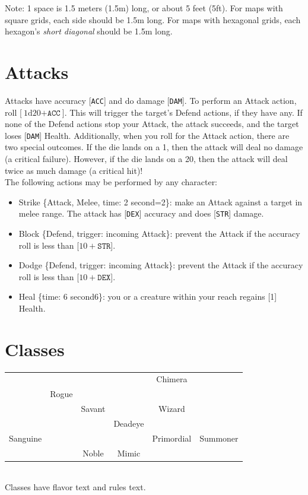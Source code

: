 \documentclass[12pt]{article}
\newcommand{\STR}{\texttt{STR}}
\newcommand{\DEX}{\texttt{DEX}}
\newcommand{\ACC}{\texttt{ACC}}
\newcommand{\DAM}{\texttt{DAM}}
\newcommand{\TIME}[1]{\{time: #1 second\if1#1{}\else{s}\fi\}}
\newcommand{\MELEE}[1]{\{Attack, Melee, time: #1 second\if1=#1{}\else{s}\fi\}}
\newcommand{\DEFEND}{\{Defend, trigger: incoming Attack\}}
\newcommand{\dice}[2]{\text{#1d#2}}
\begin{document}
Note: 1 space is 1.5 meters (1.5m) long, or about 5 feet (5ft). For maps with square grids, each side should be 1.5m long. For maps with hexagonal grids, each hexagon’s \textit{short diagonal} should be 1.5m long.

\pagebreak
\section{Attacks}

Attacks have accuracy [\ACC] and do damage [\DAM]. To perform an Attack action, roll [$\dice{1}{20} + \ACC$]. This will trigger the target’s Defend actions, if they have any. If none of the Defend actions stop your Attack, the attack succeeds, and the target loses [\DAM] Health. Additionally, when you roll for the Attack action, there are two special outcomes. If the die lands on a 1, then the attack will deal no damage (a critical failure). However, if the die lands on a 20, then the attack will deal twice as much damage (a critical hit)!
\\[5mm]
The following actions may be performed by any character:
\begin{itemize}

\item Strike \MELEE{2}: make an Attack against a target in melee range. The attack has [\DEX] accuracy and does [\STR] damage.

\item Block \DEFEND: prevent the Attack if the accuracy roll is less than [$10 + \STR$].

\item Dodge \DEFEND: prevent the Attack if the accuracy roll is less than [$10 + \DEX$].

\item Heal \TIME{6}: you or a creature within your reach regains [1] Health.

\end{itemize}

\pagebreak
\section{Classes}

\begin{tabularx}{\textwidth}{CCCCCC}
 &  &  &  & Chimera &  \\
 & Rogue &  &  &  &  \\
 &  & Savant &  & Wizard &  \\
 &  &  & Deadeye &  &   \\
Sanguine &  &  &  & Primordial & Summoner \\
 &  & Noble & Mimic &  &  \\
\end{tabularx}
\\[5mm]
Classes have flavor text and rules text.
\end{document}

